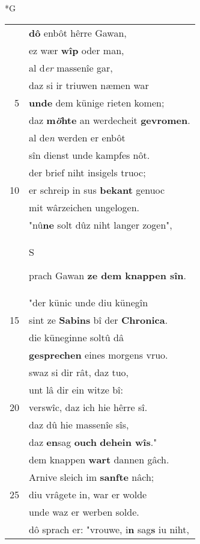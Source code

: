 \documentclass[8pt,a4paper,notitlepage]{article}
\begin{document}
\newpage
\begin{table}[ht]
\begin{minipage}[t]{0.5\linewidth}
\small
\begin{center}*G
\end{center}
\begin{tabular}{rl}
 & \textbf{dô} enbôt hêrre Gawan,\\ 
 & ez wær \textbf{wîp} oder man,\\ 
 & al d\textit{er} massenîe gar,\\ 
 & daz si ir triuwen næmen war\\ 
5 & \textbf{unde} dem künige rieten komen;\\ 
 & daz \textbf{m\textit{ö}hte} an werdecheit \textbf{gevromen}.\\ 
 & al de\textit{n} werden er enbôt\\ 
 & sîn dienst unde kampfes nôt.\\ 
 & der brief niht insigels truoc;\\ 
10 & er schreip in sus \textbf{bekant} genuoc\\ 
 & mit wârzeichen ungelogen.\\ 
 & "nû\textbf{ne} solt dûz niht langer zogen",\\ 
 & \begin{large}S\end{large}prach Gawan \textbf{ze dem knappen sîn}.\\ 
 & "der künic unde diu künegîn\\ 
15 & sint ze \textbf{Sabins} bî der \textbf{Chronica}.\\ 
 & die küneginne soltû dâ\\ 
 & \textbf{gesprechen} eines morgens vruo.\\ 
 & swaz si dir rât, daz tuo,\\ 
 & unt lâ dir ein witze bî:\\ 
20 & verswîc, daz ich hie hêrre sî.\\ 
 & daz dû hie massenîe sîs,\\ 
 & daz \textbf{en}sag \textbf{ouch} \textbf{dehein wîs}."\\ 
 & dem knappen \textbf{wart} dannen gâch.\\ 
 & Arnive sleich im \textbf{sanfte} nâch;\\ 
25 & diu vrâgete in, war er wolde\\ 
 & unde waz er werben solde.\\ 
 & dô sprach er: "vrouwe, i\textbf{n} sag\textbf{s} iu niht,\\ 

\end{tabular}
\end{minipage}
\end{table}
\end{document}
